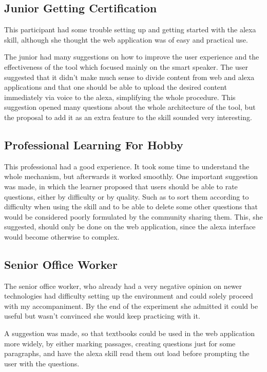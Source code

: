 \subsection{Junior Getting Certification}
This participant had some trouble setting up and getting started with the alexa skill, although she 
thought the web application was of easy and practical use.

The junior had many suggestions on how to improve the user experience and 
the effectiveness of the tool which focused mainly on the smart speaker. The user suggested that
it didn't make much sense to divide content from web and alexa applications and that one should be
able to upload the desired content immediately via voice to the alexa, simplifying the whole procedure.
This suggestion opened many questions about the whole architecture of the tool, but the 
proposal to add it as an extra feature to the skill sounded very interesting.

\subsection{Professional Learning For Hobby}
This professional had a good experience. It took some time to understand the whole mechanism, but  afterwards it worked smoothly. One important suggestion was made, in which the learner proposed that
users should be able to rate questions, either by difficulty or by quality. Such as to sort them 
according to difficulty when using the skill and to be able to delete some other questions that would
be considered poorly formulated by the community sharing them. This, she suggested, should only be done
on the web application, since the alexa interface would become otherwise to complex.


\subsection{Senior Office Worker}
The senior office worker, who already had a very negative opinion on newer technologies had difficulty
setting up the environment and could solely proceed with my accompaniment. By the end of the experiment
she admitted it could be useful but wasn't convinced she would keep practicing with it. 

A suggestion was made, so that textbooks could be used in the web application more widely, by either
marking passages, creating questions just for some paragraphs, and have the alexa skill read them out load
before prompting the user with the questions.


